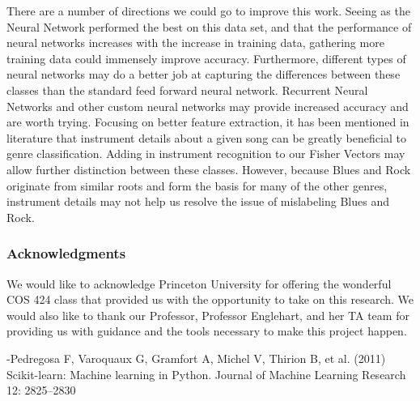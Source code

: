 \documentclass{article} %
\begin{document}
There are a number of directions we could go to improve this work. Seeing as the Neural Network performed the best on this data set, and that the performance of neural networks increases with the increase in training data, gathering more training data could immensely improve accuracy. Furthermore, different types of neural networks may do a better job at capturing the differences between these classes than the standard feed forward neural network. Recurrent Neural Networks and other custom neural networks may provide increased accuracy and are worth trying. Focusing on better feature extraction, it has been mentioned in literature that instrument details about a given song can be greatly beneficial to genre classification. Adding in instrument recognition to our Fisher Vectors may allow further distinction between these classes. However, because Blues and Rock originate from similar roots and form the basis for many of the other genres, instrument details may not help us resolve the issue of mislabeling Blues and Rock.

\subsubsection*{Acknowledgments}
We would like to acknowledge Princeton University for offering the wonderful COS 424 class that provided us with the opportunity to take on this research. We would also like to thank our Professor, Professor Englehart, and her TA team for providing us with guidance and the tools necessary to make this project happen.


-Pedregosa F, Varoquaux G, Gramfort A, Michel V, Thirion B, et al. (2011) Scikit-learn: Machine
learning in Python. Journal of Machine Learning Research 12: 2825–2830
\end{document}
